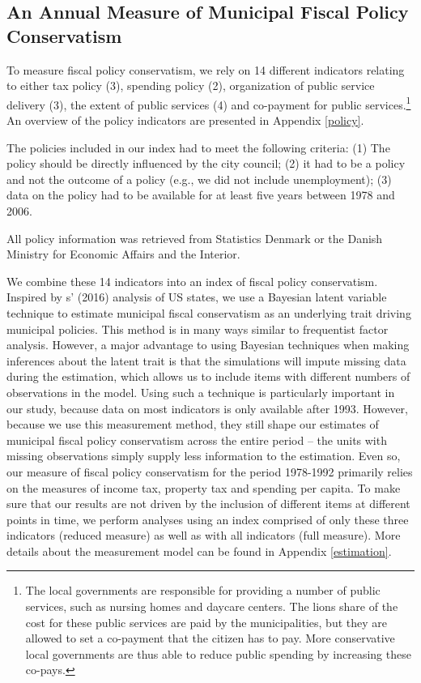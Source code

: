 \documentclass[a4paper,12pt]{article}
\begin{document}
\subsection*{An Annual Measure of Municipal Fiscal Policy Conservatism}

To measure fiscal policy conservatism, we rely on 14 different indicators relating to either tax policy (3), spending policy (2), organization of public service delivery (3), the extent of public services (4) and co-payment for public services.\footnote{The local governments are responsible for providing a number of public services, such as nursing homes and daycare centers. The lions share of the cost for these public services are paid by the municipalities, but they are allowed to set a co-payment that the citizen has to pay. More conservative local governments are thus able to reduce public spending by increasing these co-pays.}  An overview of the policy indicators are presented in Appendix \ref{policy}.

The policies included in our index had to meet the following criteria: (1) The policy should be directly influenced by the city council; (2) it had to be a policy and not the outcome of a policy (e.g., we did not include unemployment); (3) data on the policy had to be available for at least five years between 1978 and 2006. 

All policy information was retrieved from Statistics Denmark or the Danish Ministry for Economic Affairs and the Interior.

We combine these 14 indicators into an index of fiscal policy conservatism. Inspired by \citeauthor{caughey2016dynamics}s' (2016) analysis of US states, we use a Bayesian latent variable technique to estimate municipal fiscal conservatism as an underlying trait driving municipal policies.  This method is in many ways similar to frequentist factor analysis. However, a major advantage to using Bayesian techniques when making inferences about the latent trait is that the simulations will impute missing data during the estimation, which allows us to include items with different numbers of observations in the model. Using such a technique is particularly important in our study, because data on most indicators is only available after 1993. However, because we use this measurement method, they still shape our estimates of municipal fiscal policy conservatism across the entire period -- the units with missing observations simply supply less information to the estimation. Even so, our measure of fiscal policy conservatism for the period 1978-1992 primarily relies on the measures of income tax, property tax and spending per capita. To make sure that our results are not driven by the inclusion of different items at different points in time, we perform analyses using an index comprised of only these three indicators (reduced measure) as well as with all indicators (full measure). More details about the measurement model can be found in Appendix \ref{estimation}.
\end{document}

